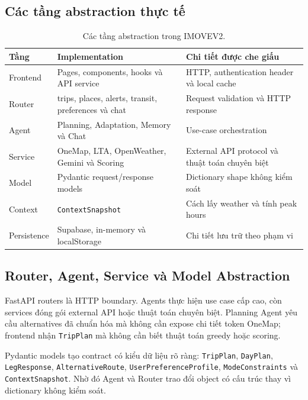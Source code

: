 \documentclass[12pt,a4paper]{article}
\begin{document}
\subsection{Các tầng abstraction thực tế}


\begin{table}[H]
\centering
\begin{tabularx}{\textwidth}{|L{3.2cm}|X|X|}
\hline
\textbf{Tầng} & \textbf{Implementation} & \textbf{Chi tiết được che giấu} \\ \hline
Frontend & Pages, components, hooks và API service & HTTP, authentication header và local cache \\ \hline
Router & trips, places, alerts, transit, preferences và chat & Request validation và HTTP response \\ \hline
Agent & Planning, Adaptation, Memory và Chat & Use-case orchestration \\ \hline
Service & OneMap, LTA, OpenWeather, Gemini và Scoring & External API protocol và thuật toán chuyên biệt \\ \hline
Model & Pydantic request/response models & Dictionary shape không kiểm soát \\ \hline
Context & \texttt{ContextSnapshot} & Cách lấy weather và tính peak hours \\ \hline
Persistence & Supabase, in-memory và localStorage & Chi tiết lưu trữ theo phạm vi \\ \hline
\end{tabularx}
\caption{Các tầng abstraction trong IMOVEV2.}
\label{tab:abstraction-layers}
\end{table}

\subsection{Router, Agent, Service và Model Abstraction}


FastAPI routers là HTTP boundary. Agents thực hiện use case cấp cao, còn services đóng gói external API hoặc thuật toán chuyên biệt. Planning Agent yêu cầu alternatives đã chuẩn hóa mà không cần expose chi tiết token OneMap; frontend nhận \texttt{TripPlan} mà không cần biết thuật toán greedy hoặc scoring.

Pydantic models tạo contract có kiểu dữ liệu rõ ràng: \texttt{TripPlan}, \texttt{DayPlan}, \texttt{LegResponse}, \texttt{AlternativeRoute}, \texttt{UserPreferenceProfile}, \texttt{ModeConstraints} và \texttt{ContextSnapshot}. Nhờ đó Agent và Router trao đổi object có cấu trúc thay vì dictionary không kiểm soát.
\end{document}
